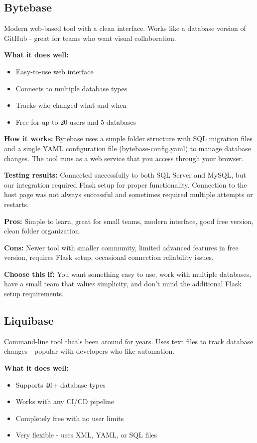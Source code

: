 \documentclass[11pt,a4paper]{article}
\begin{document}
\subsection{Bytebase}

Modern web-based tool with a clean interface. Works like a database version of GitHub - great for teams who want visual collaboration.

\textbf{What it does well:}
\begin{itemize}
    \item Easy-to-use web interface
    \item Connects to multiple database types
    \item Tracks who changed what and when
    \item Free for up to 20 users and 5 databases
\end{itemize}

\textbf{How it works:} Bytebase uses a simple folder structure with SQL migration files and a single YAML configuration file (bytebase-config.yaml) to manage database changes. The tool runs as a web service that you access through your browser.

\textbf{Testing results:} Connected successfully to both SQL Server and MySQL, but our integration required Flask setup for proper functionality. Connection to the host page was not always successful and sometimes required multiple attempts or restarts.

\textbf{Pros:} Simple to learn, great for small teams, modern interface, good free version, clean folder organization.

\textbf{Cons:} Newer tool with smaller community, limited advanced features in free version, requires Flask setup, occasional connection reliability issues.

\textbf{Choose this if:} You want something easy to use, work with multiple databases, have a small team that values simplicity, and don't mind the additional Flask setup requirements.

\subsection{Liquibase}

Command-line tool that's been around for years. Uses text files to track database changes - popular with developers who like automation.

\textbf{What it does well:}
\begin{itemize}
    \item Supports 40+ database types
    \item Works with any CI/CD pipeline
    \item Completely free with no user limits
    \item Very flexible - uses XML, YAML, or SQL files
\end{itemize}
\end{document}
